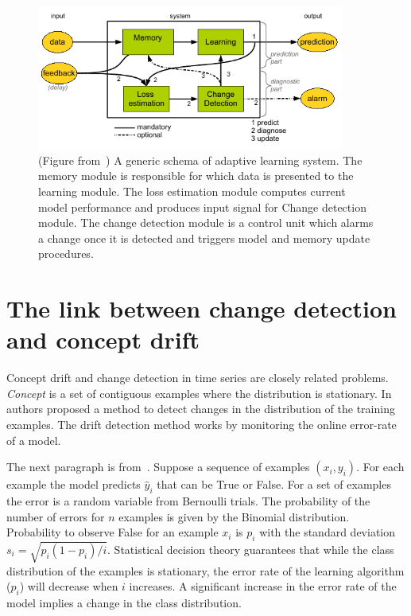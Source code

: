 \begin{figure}[htb!]
	\centering
	\includegraphics[width=0.9\textwidth]{images/images_cropped/gama_survey_cd_fig3}
  \caption{(Figure from~\cite{gama2014survey}) 
	A generic schema of adaptive learning system.
  The memory module is responsible for which data is presented to the learning module.
  The loss estimation module computes current model performance and produces input signal for Change detection module.  
  The change detection module is a control unit which alarms a change once it is detected and triggers model and memory update procedures.
	}\label{fig:fig3_gama_survey_cd}
\end{figure}


\section{The link between change detection and concept drift}

Concept drift and change detection in time series are closely related problems.
\textit{Concept} is a set of contiguous examples where the distribution is stationary.
In~\cite{gama2004learning} authors proposed a method to detect changes in the distribution of the training examples.
The drift detection method works by monitoring the online error-rate of a model.

The next paragraph is from~\cite{gama2004learning}.
Suppose a sequence of examples $(x_i, y_i)$.
For each example the model predicts $\hat y_i$ that can be True or False.
For a set of examples the error is a random variable from Bernoulli trials.
The probability of the number of errors for $n$ examples is given by the Binomial distribution.
Probability to observe False for an example $x_i$ is $p_i$ with the standard deviation $s_i=\sqrt{p_i(1-p_i)/i}$.
Statistical decision theory guarantees that while the class distribution of the examples is stationary, the error rate of the learning algorithm ($p_i$) will decrease when $i$ increases.
A significant increase in the error rate of the model implies a change in the class distribution.

